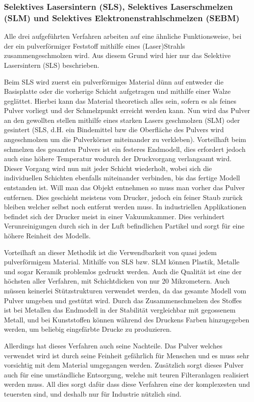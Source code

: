 \subsubsection{Selektives Lasersintern (SLS), Selektives Laserschmelzen (SLM) und Selektives Elektronenstrahlschmelzen (SEBM)}

Alle drei aufgeführten Verfahren arbeiten auf eine ähnliche Funktionsweise, bei der ein pulverförmiger Feststoff mithilfe eines (Laser)Strahls zusammengeschmolzen wird. Aus diesem Grund wird hier nur das Selektive Lasersintern (SLS) beschrieben.

Beim SLS wird zuerst ein pulverförmiges Material dünn auf entweder die Basisplatte oder die vorherige Schicht aufgetragen und mithilfe einer Walze geglättet. Hierbei kann das Material theoretisch alles sein, sofern es als feines Pulver vorliegt und der Schmelzpunkt erreicht werden kann. Nun wird das Pulver an den gewollten stellen mithilfe eines starken Lasers geschmolzen (SLM) oder gesintert (SLS, d.H. ein Bindemittel bzw die Oberfläche des Pulvers wird angeschmolzen um die Pulverkörner miteinander zu verkleben). Vorteilhaft beim schmelzen des gesamten Pulvers ist ein festeres Endmodell, dies erfordert jedoch auch eine höhere Temperatur wodurch der Druckvorgang verlangsamt wird. Dieser Vorgang wird nun mit jeder Schicht wiederholt, wobei sich die individuellen Schichten ebenfalls miteinander verbinden, bis das fertige Modell entstanden ist. Will man das Objekt entnehmen so muss man vorher das Pulver entfernen. Dies geschieht meistens vom Drucker, jedoch ein feiner Staub zurück bleiben welcher selbst noch entfernt werden muss. In industriellen Applikationen befindet sich der Drucker meist in einer Vakuumkammer. Dies verhindert Verunreinigungen durch sich in der Luft befindlichen Partikel und sorgt für eine höhere Reinheit des Modells.

Vorteilhaft an dieser Methodik ist die Verwendbarkeit von quasi jedem pulverförmigem Material. Mithilfe von SLS bzw. SLM können Plastik, Metalle und sogar Keramik problemlos gedruckt werden. Auch die Qualität ist eine der höchsten aller Verfahren, mit Schichtdicken von nur 20 Mikrometern. Auch müssen keinerlei Stützstrukturen verwendet werden, da das gesamte Modell vom Pulver umgeben und gestützt wird. Durch das Zusammenschmelzen des Stoffes ist bei Metallen das Endmodell in der Stabilität vergleichbar mit gegossenem Metall, und bei Kunststoffen können während des Druckens Farben hinzugegeben werden, um beliebig eingefärbte Drucke zu produzieren.

Allerdings hat dieses Verfahren auch seine Nachteile. Das Pulver welches verwendet wird ist durch seine Feinheit gefährlich für Menschen und es muss sehr vorsichtig mit dem Material umgegangen werden. Zusätzlich sorgt dieses Pulver auch für eine umständliche Entsorgung, welche mit teuren Filteranlagen realisiert werden muss. All dies sorgt dafür dass diese Verfahren eine der komplexesten und teuersten sind, und deshalb nur für Industrie nützlich sind. \parencite[Informationen aus:][]{DRUCKVERFAHREN,SLSDetail}